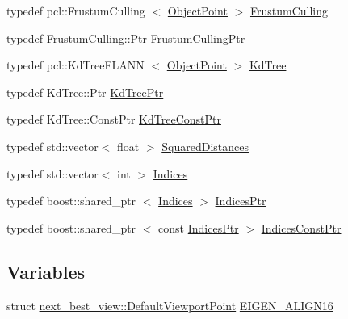\begin{DoxyCompactItemize}
\item 
typedef pcl\-::\-Frustum\-Culling\*
$<$ \hyperlink{namespacenext__best__view_aa3f3b5e178ddd208eb1d973e44c1fc70}{\-Object\-Point} $>$ \hyperlink{namespacenext__best__view_aa1201b49d32ff76f8a0c36a110dcfe63}{\-Frustum\-Culling}
\item 
typedef \-Frustum\-Culling\-::\-Ptr \hyperlink{namespacenext__best__view_a74d8e247c31e7c8d1bb9ad36281ee154}{\-Frustum\-Culling\-Ptr}
\item 
typedef pcl\-::\-Kd\-Tree\-F\-L\-A\-N\-N\*
$<$ \hyperlink{namespacenext__best__view_aa3f3b5e178ddd208eb1d973e44c1fc70}{\-Object\-Point} $>$ \hyperlink{namespacenext__best__view_aecdb1ccea5275c5dc31783d031d38d26}{\-Kd\-Tree}
\item 
typedef \-Kd\-Tree\-::\-Ptr \hyperlink{namespacenext__best__view_aab5cd60b86a4a57ae8c69c2e2570679f}{\-Kd\-Tree\-Ptr}
\item 
typedef \-Kd\-Tree\-::\-Const\-Ptr \hyperlink{namespacenext__best__view_a9f78a5f1d066677e7ff7993ae14b857b}{\-Kd\-Tree\-Const\-Ptr}
\item 
typedef std\-::vector$<$ float $>$ \hyperlink{namespacenext__best__view_aa80b6e9e4088f9660b210d1b3482513b}{\-Squared\-Distances}
\item 
typedef std\-::vector$<$ int $>$ \hyperlink{namespacenext__best__view_a5f7bbbd3006b454db2619c31098a6e61}{\-Indices}
\item 
typedef boost\-::shared\-\_\-ptr\*
$<$ \hyperlink{namespacenext__best__view_a5f7bbbd3006b454db2619c31098a6e61}{\-Indices} $>$ \hyperlink{namespacenext__best__view_a89edd5f370254b5c7689adfede9fe6a7}{\-Indices\-Ptr}
\item 
typedef boost\-::shared\-\_\-ptr\*
$<$ const \hyperlink{namespacenext__best__view_a89edd5f370254b5c7689adfede9fe6a7}{\-Indices\-Ptr} $>$ \hyperlink{namespacenext__best__view_aff39a56fc33771e72386f8cc4c9dadfc}{\-Indices\-Const\-Ptr}
\end{DoxyCompactItemize}
\subsection*{\-Variables}
\begin{DoxyCompactItemize}
\item 
struct \*
\hyperlink{structnext__best__view_1_1DefaultViewportPoint}{next\-\_\-best\-\_\-view\-::\-Default\-Viewport\-Point} \hyperlink{namespacenext__best__view_af60a57187270f681b59fceee92caa00b}{\-E\-I\-G\-E\-N\-\_\-\-A\-L\-I\-G\-N16}
\end{DoxyCompactItemize}


